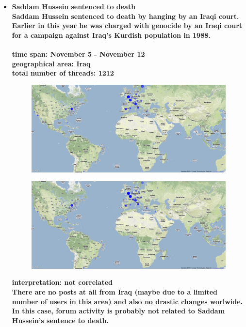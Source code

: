 \documentclass[11pt,a4paper,english]{article}
\begin{document}
\begin{itemize}
					\item \bf Saddam Hussein sentenced to death \rm
						\\ Saddam Hussein sentenced to death by hanging by an Iraqi court. Earlier in this year he was charged with genocide by an Iraqi court for a campaign against Iraq's Kurdish population in 1988.
					\\\\ \bf time span: \rm November 5 - November 12
						\\ \bf geographical area: \rm Iraq
						\\ \bf total number of threads: \rm 1212
						\begin{figure}[H]
							\vspace{-13pt}
  							\begin{center}
								\includegraphics[width=130mm]{img/pre-saddam}
							\end{center}
							\vspace{-13pt}
						\end{figure}
						\begin{figure}[H]
							\vspace{-13pt}
  							\begin{center}
								\includegraphics[width=130mm]{img/post-saddam}
							\end{center}
							\vspace{-13pt}
						\end{figure}	
						
					\bf interpretation: \rm not correlated
					\\ There are no posts at all from Iraq (maybe due to a limited number of users in this area) and also no drastic changes worlwide. In this case, forum activity is probably not related to Saddam Hussein's sentence to death.						
							
				\end{itemize}
			
\end{document}

